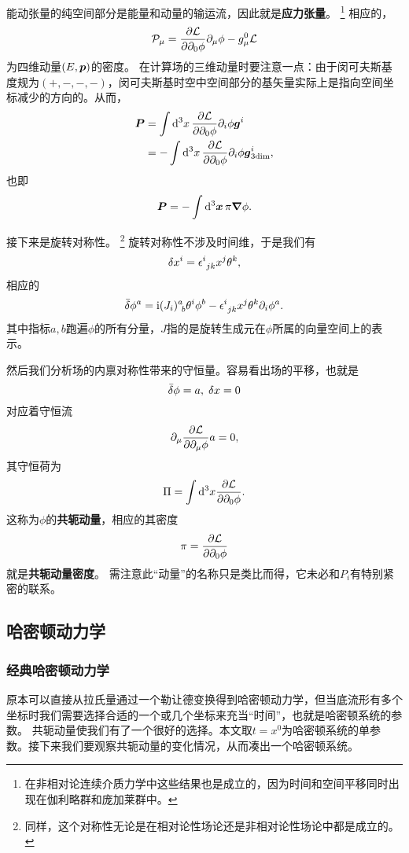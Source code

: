 \documentclass[UTF8, a4paper]{ctexart}
\newcommand*{\ii}{\mathrm{i}}
\begin{document}
能动张量的纯空间部分是能量和动量的输运流，因此就是\textbf{应力张量}。%
\footnote{在非相对论连续介质力学中这些结果也是成立的，因为时间和空间平移同时出现在伽利略群和庞加莱群中。}
相应的，
\begin{equation}
    \mathcal{P}_\mu = \pdv{\mathcal{L}}{\partial_0 \phi} \partial_\mu \phi - g_\mu^0 \mathcal{L}
\end{equation}
为四维动量$(E, \vb*{p})$的密度。
在计算场的三维动量时要注意一点：由于闵可夫斯基度规为$(+, -, -, -)$，闵可夫斯基时空中空间部分的基矢量实际上是指向空间坐标减少的方向的。从而，
\[
    \begin{aligned}
        \vb*{P} &= \int \dd[3]{x} \pdv{\mathcal{L}}{\partial_0 \phi} \partial_i \phi \vb*{g}^i \\
        &= - \int \dd[3]{x} \pdv{\mathcal{L}}{\partial_0 \phi} \partial_i \phi \vb*{g}^i_{\text{3dim}},
    \end{aligned}
\]
也即
\begin{equation}
    \vb*{P} = - \int \dd[3]{\vb*{x}} \pi \grad{\phi}.
\end{equation}

接下来是旋转对称性。%
\footnote{同样，这个对称性无论是在相对论性场论还是非相对论性场论中都是成立的。}%
旋转对称性不涉及时间维，于是我们有
\[
    \var{x^i} = \epsilon^i_{\ jk}  x^j \theta^k,
\]
相应的
\[
    \bar{\var}{\phi^a} = \ii (J_i)^a_{\ b} \theta^i \phi^b - \epsilon^i_{\ jk}  x^j \theta^k \partial_i \phi^a.
\]
其中指标$a,b$跑遍$\phi$的所有分量，$J$指的是旋转生成元在$\phi$所属的向量空间上的表示。

然后我们分析场的内禀对称性带来的守恒量。容易看出场的平移，也就是
\[
    \bar{\var}{\phi} = a, \; \var{x} = 0
\]
对应着守恒流
\[
    \partial_\mu \pdv{\mathcal{L}}{\partial_\mu \phi } a = 0,
\]
其守恒荷为
\begin{equation}
    \Pi = \int \dd[3]x \pdv{\mathcal{L}}{\partial_0 \phi}.
\end{equation}
这称为$\phi$的\textbf{共轭动量}，相应的其密度
\begin{equation}
    \pi = \pdv{\mathcal{L}}{\partial_0 \phi}
    \label{eq:def-pi}
\end{equation}
就是\textbf{共轭动量密度}。
需注意此“动量”的名称只是类比而得，它未必和$P_i$有特别紧密的联系。

\subsection{哈密顿动力学}

\subsubsection{经典哈密顿动力学}
原本可以直接从拉氏量通过一个勒让德变换得到哈密顿动力学，但当底流形有多个坐标时我们需要选择合适的一个或几个坐标来充当“时间”，也就是哈密顿系统的参数。
共轭动量使我们有了一个很好的选择。本文取$t=x^0$为哈密顿系统的单参数。接下来我们要观察共轭动量的变化情况，从而凑出一个哈密顿系统。
\end{document}
